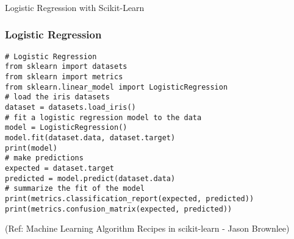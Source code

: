 \begin{frame}[fragile]\frametitle{}
\begin{center}
{\Large Logistic Regression with Scikit-Learn}
\end{center}
\end{frame}


\begin{frame}[fragile]\frametitle{Logistic Regression}
\begin{lstlisting}
# Logistic Regression
from sklearn import datasets
from sklearn import metrics
from sklearn.linear_model import LogisticRegression
# load the iris datasets
dataset = datasets.load_iris()
# fit a logistic regression model to the data
model = LogisticRegression()
model.fit(dataset.data, dataset.target)
print(model)
# make predictions
expected = dataset.target
predicted = model.predict(dataset.data)
# summarize the fit of the model
print(metrics.classification_report(expected, predicted))
print(metrics.confusion_matrix(expected, predicted))
\end{lstlisting}

{\tiny (Ref: Machine Learning Algorithm Recipes in scikit-learn - Jason Brownlee)}

\end{frame}











